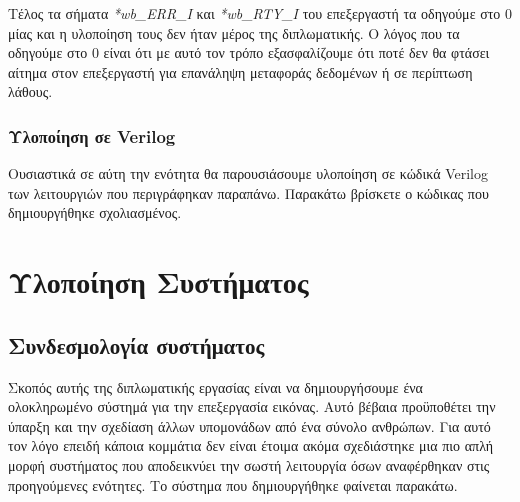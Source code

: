 \documentclass[a4paper,10pt]{article}
\numberwithin{figure}{section}
\numberwithin{table}{section}
\begin{document}
Τέλος τα σήματα \emph{*wb\_ERR\_I} και \emph{*wb\_RTY\_I} του επεξεργαστή τα οδηγούμε στο 0 μίας και η υλοποίηση τους δεν ήταν μέρος της διπλωματικής. Ο λόγος που τα οδηγούμε στο 0 είναι ότι με αυτό τον τρόπο εξασφαλίζουμε ότι ποτέ δεν θα φτάσει αίτημα στον επεξεργαστή για επανάληψη μεταφοράς δεδομένων ή σε περίπτωση λάθους.

\subsubsection{Υλοποίηση σε Verilog}

Ουσιαστικά σε αύτη την ενότητα θα παρουσιάσουμε υλοποίηση σε κώδικά Verilog των λειτουργιών που περιγράφηκαν παραπάνω. Παρακάτω βρίσκετε ο κώδικας που δημιουργήθηκε σχολιασμένος.
\vspace{0.7cm}
 


\newpage
\section{Υλοποίηση Συστήματος}

\subsection{Συνδεσμολογία συστήματος}
Σκοπός αυτής της διπλωματικής εργασίας είναι να δημιουργήσουμε ένα ολοκληρωμένο σύστημά για την επεξεργασία εικόνας. Αυτό βέβαια προϋποθέτει την ύπαρξη και την σχεδίαση άλλων υπομονάδων από ένα σύνολο ανθρώπων. Για αυτό τον λόγο επειδή κάποια κομμάτια δεν είναι έτοιμα ακόμα σχεδιάστηκε μια πιο απλή μορφή συστήματος που αποδεικνύει την σωστή λειτουργία όσων αναφέρθηκαν στις προηγούμενες ενότητες. Το σύστημα που δημιουργήθηκε φαίνεται παρακάτω.
\end{document}
